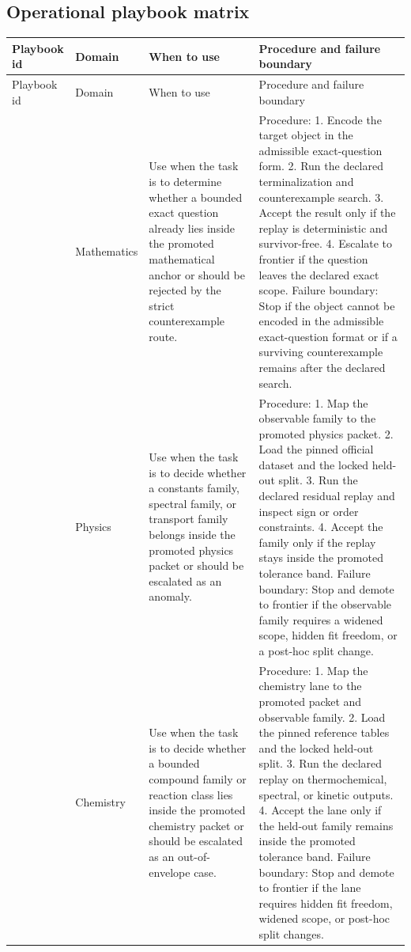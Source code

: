 \subsection{Operational playbook matrix}
\begin{longtable}{@{}L{0.15\textwidth}L{0.13\textwidth}L{0.18\textwidth}L{0.38\textwidth}@{}}
\toprule
Playbook id & Domain & When to use & Procedure and failure boundary \\
\midrule
\endfirsthead
\toprule
Playbook id & Domain & When to use & Procedure and failure boundary \\
\midrule
\endhead
{} & Mathematics & Use when the task is to determine whether a bounded exact question already lies inside the promoted mathematical anchor or should be rejected by the strict counterexample route. & Procedure: 1. Encode the target object in the admissible exact-question form. 2. Run the declared terminalization and counterexample search. 3. Accept the result only if the replay is deterministic and survivor-free. 4. Escalate to frontier if the question leaves the declared exact scope. \allowbreak Failure boundary: Stop if the object cannot be encoded in the admissible exact-question format or if a surviving counterexample remains after the declared search. \\
 & Physics & Use when the task is to decide whether a constants family, spectral family, or transport family belongs inside the promoted physics packet or should be escalated as an anomaly. & Procedure: 1. Map the observable family to the promoted physics packet. 2. Load the pinned official dataset and the locked held-out split. 3. Run the declared residual replay and inspect sign or order constraints. 4. Accept the family only if the replay stays inside the promoted tolerance band. \allowbreak Failure boundary: Stop and demote to frontier if the observable family requires a widened scope, hidden fit freedom, or a post-hoc split change. \\
 & Chemistry & Use when the task is to decide whether a bounded compound family or reaction class lies inside the promoted chemistry packet or should be escalated as an out-of-envelope case. & Procedure: 1. Map the chemistry lane to the promoted packet and observable family. 2. Load the pinned reference tables and the locked held-out split. 3. Run the declared replay on thermochemical, spectral, or kinetic outputs. 4. Accept the lane only if the held-out family remains inside the promoted tolerance band. \allowbreak Failure boundary: Stop and demote to frontier if the lane requires hidden fit freedom, widened scope, or post-hoc split changes. \\

\end{longtable}
